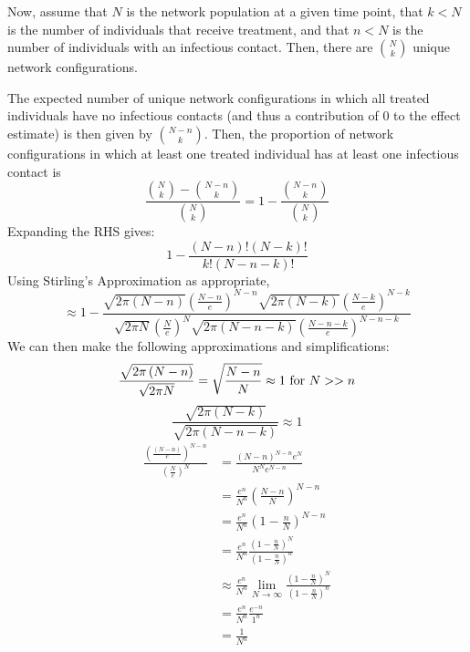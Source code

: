 \documentclass{article}
\theoremstyle{definition}
\begin{document}
Now, assume that $N$ is the network population at a given time point, that $k<N$ is the number of individuals that receive treatment, and that $n<N$ is the number of individuals with an infectious contact. Then, there are $\binom{N}{k}$ unique network configurations.
 
The expected number of unique network configurations in which all treated individuals have no infectious contacts (and thus a contribution of 0 to the effect estimate) is then given by $\binom{N-n}{k}$. Then, the proportion of network configurations in which at least one treated individual has at least one infectious contact is 
\begin{equation} 
\frac{{\binom{N}{k}}-{\binom{N-n}{k}}}{{\binom{N}{k}}}=1-\frac{{\binom{N-n}{k}}}{{\binom{N}{k}}}  \nonumber
\end{equation}
Expanding the RHS gives:
\begin{equation}
1-\frac{\left(N-n\right)!\left(N-k\right)!}{k!\left(N-n-k\right)!} \nonumber
\end{equation}
Using Stirling's Approximation as appropriate,
\begin{equation}
\approx 1-\frac{\sqrt{2\pi\left(N-n\right)}\left(\frac{N-n}{e}\right)^{N-n}\sqrt{2\pi\left(N-k\right)}\left(\frac{N-k}{e}\right)^{N-k}}{\sqrt{2\pi N}\left(\frac{N}{e}\right)^{N}\sqrt{2\pi \left(N-n-k\right)}\left(\frac{N-n-k}{e}\right)^{N-n-k}}     \nonumber
\end{equation}
We can then make the following approximations and simplifications:
\begin{equation}
    \frac{\sqrt{2\pi \left(N-n\right)}}{\sqrt{2\pi N}}=\sqrt{\frac{N-n}{N}}\approx 1 \text{ for } N>>n \nonumber\\
    \end{equation}
    \begin{equation}
    \frac{\sqrt{2 \pi \left(N-k\right)}}{\sqrt{2 \pi \left(N-n-k\right)}}\approx 1 \nonumber
\end{equation}
    \begin{align}
    \frac{\left(\frac{\left(N-n\right)}{e}\right)^{N-n}}{{\left(\frac{N}{e}\right)^{N}}}&=\frac{\left(N-n\right)^{N-n}e^{N}}{N^{N}e^{N-n}} \nonumber\\
     &=\frac{e^{n}}{N^{n}}\left(\frac{N-n}{N}\right)^{N-n} \nonumber\\
     &=\frac{e^{n}}{N^{n}}\left(1-\frac{n}{N}\right)^{N-n} \nonumber\\
     &=\frac{e^{n}}{N^{n}}\frac{\left(1-\frac{n}{N}\right)^{N}}{\left(1-\frac{n}{N}\right)^{n}} \nonumber\\
     &\approx \frac{e^{n}}{N^{n}}\lim_{N \to \infty}\frac{\left(1-\frac{n}{N}\right)^{N}}{\left(1-\frac{n}{N}\right)^{n}} \nonumber\\
     &=\frac{e^{n}}{N^{n}}\frac{e^{-n}}{1^{n}} \nonumber\\
     &=\frac{1}{N^{n}} \nonumber
\end{align}
\end{document}
